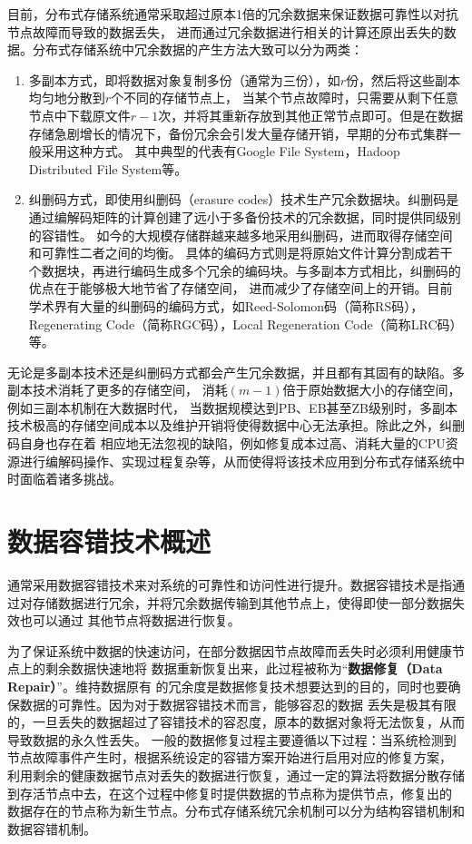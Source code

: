 目前，分布式存储系统通常采取超过原本1倍的冗余数据来保证数据可靠性以对抗节点故障而导致的数据丢失，
进而通过冗余数据进行相关的计算还原出丢失的数据。分布式存储系统中冗余数据的产生方法大致可以分为两类：
\begin{enumerate}
	\item 多副本方式，即将数据对象复制多份（通常为三份），如$r$份，然后将这些副本均匀地分散到$r$个不同的存储节点上，
	      当某个节点故障时，只需要从剩下任意节点中下载原文件$r-1$次，并将其重新存放到其他正常节点即可。但是在数据存储急剧增长的情况下，备份冗余会引发大量存储开销，早期的分布式集群一般采用这种方式。
	      其中典型的代表有Google File System\cite{ghemawat2003google}，Hadoop Distributed File System\cite{borthakur2008hdfs}等。
	\item 纠删码方式，即使用纠删码（erasure codes）技术生产冗余数据块。纠删码是通过编解码矩阵的计算创建了远小于多备份技术的冗余数据，同时提供同级别的容错性\cite{weatherspoon2002erasure}。
	      如今的大规模存储群越来越多地采用纠删码\citep{ford2010availability,huang2012erasure,muralidhar2014f4,ovsiannikov2013quantcast}，进而取得存储空间和可靠性二者之间的均衡。
	      具体的编码方式则是将原始文件计算分割成若干个数据块，再进行编码生成多个冗余的编码块。与多副本方式相比，纠删码的优点在于能够极大地节省了存储空间，
	      进而减少了存储空间上的开销。目前学术界有大量的纠删码的编码方式，如Reed-Solomon码（简称RS码）\cite{reed1960polynomial}，
	      Regenerating Code（简称RGC码）\cite{wu2009reducing}，Local Regeneration Code（简称LRC码）\cite{kamath2014codes}等。
\end{enumerate}

无论是多副本技术还是纠删码方式都会产生冗余数据，并且都有其固有的缺陷。多副本技术消耗了更多的存储空间，
消耗$(m-1)$倍于原始数据大小的存储空间，例如三副本机制在大数据时代，
当数据规模达到PB、EB甚至ZB级别时，多副本技术极高的存储空间成本以及维护开销将使得数据中心无法承担。除此之外，纠删码自身也存在着
相应地无法忽视的缺陷，例如修复成本过高、消耗大量的CPU资源进行编解码操作、实现过程复杂等，从而使得将该技术应用到分布式存储系统中时面临着诸多挑战。

\section{数据容错技术概述}

通常采用数据容错技术来对系统的可靠性和访问性进行提升。数据容错技术是指通过对存储数据进行冗余，并将冗余数据传输到其他节点上，使得即使一部分数据失效也可以通过
其他节点将数据进行恢复。

为了保证系统中数据的快速访问，在部分数据因节点故障而丢失时必须利用健康节点上的剩余数据快速地将
数据重新恢复出来，此过程被称为“\textbf{数据修复（Data Repair）}”\cite{li2009tree}。维持数据原有
的冗余度是数据修复技术想要达到的目的，同时也要确保数据的可靠性。因为对于数据容错技术而言，能够容忍的数据
丢失是极其有限的，一旦丢失的数据超过了容错技术的容忍度，原本的数据对象将无法恢复，从而导致数据的永久性丢失。
一般的数据修复过程主要遵循以下过程：当系统检测到节点故障事件产生时，根据系统设定的容错方案开始进行启用对应的修复方案，
利用剩余的健康数据节点对丢失的数据进行恢复，通过一定的算法将数据分散存储到存活节点中去，在这个过程中修复时提供数据的节点称为提供节点，修复出的
数据存在的节点称为新生节点。分布式存储系统冗余机制可以分为结构容错机制和数据容错机制。

